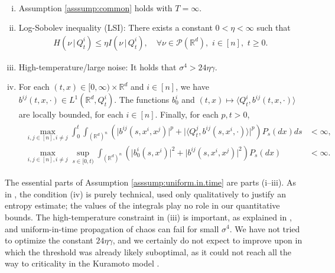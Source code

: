 \documentclass[11pt,reqno]{amsart}
\numberwithin{equation}{section}
\theoremstyle{definition}
\newenvironment{manualassum}[1]{%
	\renewcommand\themanualassuminner{#1}%
	\manualassuminner
}{\endmanualassuminner}
\def\P{{\mathcal P}}
\def\R{{\mathbb R}}
\begin{document}
\begin{manualassum}{U} \label{asssump:uniform.in.time}
{ \ }
	\begin{enumerate}[(i)] 
		\item Assumption \ref{asssump:common} holds with $ T = \infty $. 
		\item Log-Sobolev inequality (LSI): There exists a constant $0 < \eta < \infty$ such that 
		\begin{align*}
			H(\nu \, |\, Q^i_t) \le \eta I(\nu \,|\, Q^i_t), \quad \forall \nu \in \P(\R^d), \,\, i \in [n], \,\, t \ge 0. 
		\end{align*} 
		\item High-temperature/large noise: It holds that $\sigma^4 > 24 \eta \gamma $.
		\item 
		For each $(t,x) \in [0, \infty) \times \R^d$ and $i \in [n]$, we have $b^{ij}(t, x, \cdot) \in L^1(\R^d,Q^i_t)$.  The functions $b_0^i$ and $(t,x) \mapsto \langle Q^i_t, b^{ij}(t, x, \cdot)\rangle$ are locally bounded, for each $i \in [n]$.
		Finally, for each $p, t > 0$, 
		\begin{align} \label{assump.unit.int}
		\begin{split}
			\max_{i,j \in [n], i \neq j}\int_0^t \int_{(\R^d)^n} \left(\big| b^{ij}(s, x^i, x^j) \big|^p + \big| \langle Q^j_t, b^{ij}(s, x^i, \cdot) \rangle \big|^p \right) P_s (dx)ds &< \infty,\\
		\max_{i,j \in [n], i \neq j} \sup_{s \in [0, t)} \int_{(\R^d)^n} \left(\big| b_0^i(s, x^i) \big|^2 + \big| b^{ij}(s, x^i, x^j) \big|^2\right) P_s (dx) &< \infty.
		\end{split}
		\end{align}
	\end{enumerate}	
\end{manualassum}

The essential parts of Assumption \ref{asssump:uniform.in.time} are parts (i--iii). As in \cite[Assumption (E)]{lacker2023sharp}, the condition (iv) is purely technical, used only qualitatively to justify an entropy estimate; the values of the integrals play no role in our quantitative bounds. The high-temperature constraint in (iii) is important, as explained in \cite[Remark 2.2]{lacker2023sharp}, and uniform-in-time propagation of chaos can fail for small $\sigma^4$. We have not tried to optimize the constant $24\eta\gamma$, and we certainly do not expect to improve upon \cite{lacker2023sharp} in which the threshold was already likely suboptimal, as it could not reach all the way to criticality in the Kuramoto model \cite[Example 2.10]{lacker2023sharp}. 
\end{document}
